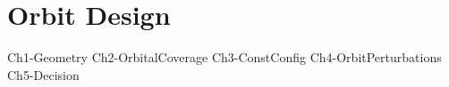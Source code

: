% 
%





\setlength{\parindent}{0pt}

\usepackage{epigraph}
\usepackage{tocloft}




\newpage\thispagestyle{EmptyPage}
\mbox{}\newpage


\setcounter{tocdepth}{3}
\tableofcontents
\pagebreak

\renewcommand{\cfttabnumwidth}{4em}
\listoftables
\pagebreak

\renewcommand{\cftfignumwidth}{4em}
\listoffigures



\newpage
{}

\newpage
\setlength{\parskip}{1em}


\part{Orbit Design}
{Ch1-Geometry}
{Ch2-OrbitalCoverage}
{Ch3-ConstConfig}
{Ch4-OrbitPerturbations}
{Ch5-Decision}

